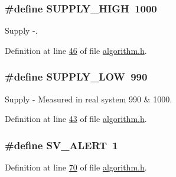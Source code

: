 \hypertarget{a00021_a338142762317568b3b258e83442c2986}{
\subsubsection[{S\+U\+P\+P\+L\+Y\+\_\+\+H\+I\+G\+H}]{\setlength{\rightskip}{0pt plus 5cm}\#define S\+U\+P\+P\+L\+Y\+\_\+\+H\+I\+G\+H~1000}}\label{a00021_a338142762317568b3b258e83442c2986}


Supply -\/. 



Definition at line \hyperlink{a00021_source_l00046}{46} of file \hyperlink{a00021_source}{algorithm.\+h}.

\hypertarget{a00021_a7c28268c9463a51a0f1e27d3ac941c12}{
\subsubsection[{S\+U\+P\+P\+L\+Y\+\_\+\+L\+O\+W}]{\setlength{\rightskip}{0pt plus 5cm}\#define S\+U\+P\+P\+L\+Y\+\_\+\+L\+O\+W~990}}\label{a00021_a7c28268c9463a51a0f1e27d3ac941c12}


Supply -\/ Measured in real system 990 \& 1000. 



Definition at line \hyperlink{a00021_source_l00043}{43} of file \hyperlink{a00021_source}{algorithm.\+h}.

\hypertarget{a00021_af66e399e9c5b681f0c1468708a6c9d38}{
\subsubsection[{S\+V\+\_\+\+A\+L\+E\+R\+T}]{\setlength{\rightskip}{0pt plus 5cm}\#define S\+V\+\_\+\+A\+L\+E\+R\+T~1}}\label{a00021_af66e399e9c5b681f0c1468708a6c9d38}


Definition at line \hyperlink{a00021_source_l00070}{70} of file \hyperlink{a00021_source}{algorithm.\+h}.

